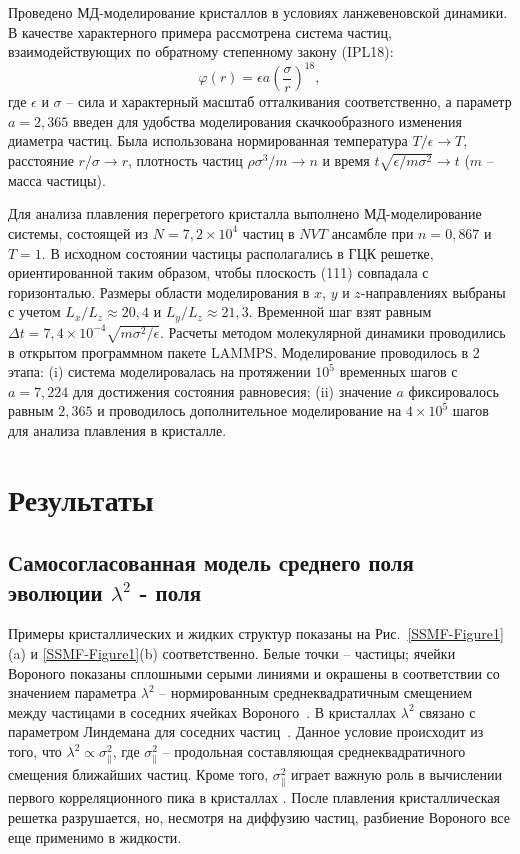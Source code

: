 Проведено МД-моделирование кристаллов в условиях ланжевеновской динамики.
В качестве характерного примера рассмотрена система частиц, взаимодействующих по обратному степенному закону (IPL18):
\begin{equation}
  \label{SSMF-eq3}
  \varphi(r) = \epsilon a \left(\frac{\sigma}{r}\right)^{18},
\end{equation}
где $\epsilon$ и $\sigma$ -- сила и характерный масштаб отталкивания соответственно,
а параметр $ a = 2{,}365 $ введен для удобства моделирования скачкообразного изменения диаметра частиц.
Была использована нормированная температура $ T/ \epsilon \rightarrow T $, расстояние $ r/ \sigma \rightarrow r $, плотность частиц $\rho\sigma^3/m\rightarrow n$ и время $t\sqrt{\epsilon/m\sigma^2} \rightarrow t$ ($m$ -- масса частицы).

Для анализа плавления перегретого кристалла выполнено МД-моделирование системы, состоящей из $ N = 7{,}2 \times 10 ^ 4 $ частиц в $NVT$ ансамбле при $n=0{,}867$ и $T=1$.
В исходном состоянии частицы располагались в ГЦК решетке, ориентированной таким образом, чтобы плоскость (111) совпадала с горизонталью.
Размеры области моделирования в $ x $, $ y $ и $ z $-направлениях выбраны с учетом $ L_x / L_z \approx 20{,}4 $ и $ L_y / L_z \approx 21{,}3 $.
Временной шаг взят равным $ \Delta t = 7{,}4 \times 10 ^ {- 4} \sqrt {m \sigma ^ 2 / \epsilon}$.
Расчеты методом молекулярной динамики проводились в открытом программном пакете LAMMPS.
Моделирование проводилось в 2 этапа: (i) система моделировалась на протяжении $ 10 ^ 5 $ временных шагов с $ a = 7{,}224 $ для достижения состояния равновесия; (ii) значение $a$ фиксировалось равным $ 2{,}365 $ и проводилось дополнительное моделирование на $ 4 \times 10 ^ 5 $ шагов для анализа плавления в кристалле.

\section{Результаты}
\subsection{Самосогласованная модель среднего поля эволюции \texorpdfstring{$\lambda^2$}{lambda2} - поля}

Примеры кристаллических и жидких структур показаны на Рис.~\ref{SSMF-Figure1}(a) и \ref{SSMF-Figure1}(b) соответственно.
Белые точки -- частицы; ячейки Вороного показаны сплошными серыми линиями и окрашены в соответствии со значением параметра $\lambda^2$ -- нормированным среднеквадратичным смещением между частицами в соседних ячейках Вороного~\cite{10.1021/acs.jpcc.7b09317}.
В кристаллах $\lambda^2$ связано с параметром Линдемана для соседних частиц~\cite{10.1016/0375-9601(85)90617-6}.
Данное условие происходит из того, что $\lambda^2\propto \sigma_ \| ^ 2 $, где $ \sigma_ \| ^ 2 $ -- продольная составляющая среднеквадратичного смещения ближайших частиц.
Кроме того, $ \sigma_ \| ^ 2 $ играет важную роль в вычислении первого корреляционного пика в кристаллах \cite{10.1063/1.4869863, 10.1063/1.4926945, 10.1088/0953-8984/28/23/235401, 10.1039/c7sm02429k, 10.1063/1.5116176}.
После плавления кристаллическая решетка разрушается, но, несмотря на диффузию частиц, разбиение Вороного все еще применимо в жидкости.


